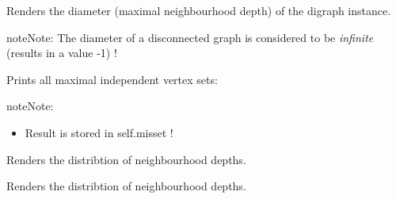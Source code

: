 \documentclass[letterpaper,10pt,english]{sphinxmanual}
\begin{document}
\begin{fulllineitems}
\begin{fulllineitems}
\end{fulllineitems}


\begin{fulllineitems}
\label{techDoc:graphs.Graph.computeDiameter}
Renders the diameter (maximal neighbourhood depth) of the digraph instance.

\begin{notice}{note}{Note:}
The diameter of a disconnected graph is considered to be \emph{infinite}
(results in a value -1) !
\end{notice}

\end{fulllineitems}


\begin{fulllineitems}
\label{techDoc:graphs.Graph.computeMIS}
Prints all maximal independent vertex sets:

\begin{notice}{note}{Note:}\begin{itemize}
\item {} 
Result is stored in self.misset !

\end{itemize}
\end{notice}

\end{fulllineitems}


\begin{fulllineitems}
\label{techDoc:graphs.Graph.computeNeighbourhoodDepth}
Renders the distribtion of neighbourhood depths.

\end{fulllineitems}


\begin{fulllineitems}
\label{techDoc:graphs.Graph.computeNeighbourhoodDepthDistribution}
Renders the distribtion of neighbourhood depths.


\end{fulllineitems}
\end{fulllineitems}
\end{document}
